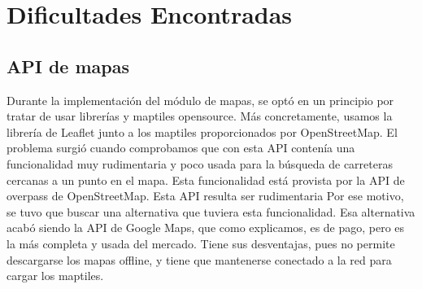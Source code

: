 \section{Dificultades Encontradas\label{SEC:DIFICULTAD}}
  \subsection{API de mapas}
    Durante la implementación del módulo de mapas, se optó en un principio por tratar de usar librerías y maptiles opensource. Más concretamente, usamos la librería de Leaflet junto a los maptiles proporcionados por OpenStreetMap.
    El problema surgió cuando comprobamos que con esta API contenía una funcionalidad muy rudimentaria y poco usada para la búsqueda de carreteras cercanas a un punto en el mapa. Esta funcionalidad está provista por la API de overpass de OpenStreetMap. Esta API resulta ser rudimentaria 
    Por ese motivo, se tuvo que buscar una alternativa que tuviera esta funcionalidad. Esa alternativa acabó siendo la API de Google Maps, que como explicamos, es de pago, pero es la más completa y usada del mercado.
    Tiene sus desventajas, pues no permite descargarse los mapas offline, y tiene que mantenerse conectado a la red para cargar los maptiles.
